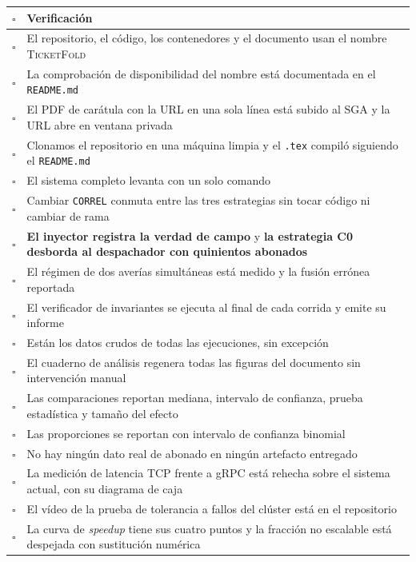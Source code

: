 \documentclass[11pt,a4paper]{article}
\begin{document}
	\begin{center}
		\small
		\begin{longtable}{@{}p{0.7cm}p{14.2cm}@{}}
			\toprule
			\textbf{$\square$} & \textbf{Verificación} \\
			\midrule
			\endhead
			$\square$ & El repositorio, el código, los contenedores y el documento usan el nombre \textsc{TicketFold} \\
			$\square$ & La comprobación de disponibilidad del nombre está documentada en el \texttt{README.md} \\
			$\square$ & El PDF de carátula con la URL en una sola línea está subido al SGA y la URL abre en ventana privada \\
			$\square$ & Clonamos el repositorio en una máquina limpia y el \texttt{.tex} compiló siguiendo el \texttt{README.md} \\
			$\square$ & El sistema completo levanta con un solo comando \\
			$\square$ & Cambiar \texttt{CORREL} conmuta entre las tres estrategias sin tocar código ni cambiar de rama \\
			$\square$ & \textbf{El inyector registra la verdad de campo} y \textbf{la estrategia C0 desborda al despachador con quinientos abonados} \\
			$\square$ & El régimen de dos averías simultáneas está medido y la fusión errónea reportada \\
			$\square$ & El verificador de invariantes se ejecuta al final de cada corrida y emite su informe \\
			$\square$ & Están los datos crudos de todas las ejecuciones, sin excepción \\
			$\square$ & El cuaderno de análisis regenera todas las figuras del documento sin intervención manual \\
			$\square$ & Las comparaciones reportan mediana, intervalo de confianza, prueba estadística y tamaño del efecto \\
			$\square$ & Las proporciones se reportan con intervalo de confianza binomial \\
			$\square$ & No hay ningún dato real de abonado en ningún artefacto entregado \\
			$\square$ & La medición de latencia TCP frente a gRPC está rehecha sobre el sistema actual, con su diagrama de caja \\
			$\square$ & El vídeo de la prueba de tolerancia a fallos del clúster está en el repositorio \\
			$\square$ & La curva de \emph{speedup} tiene sus cuatro puntos y la fracción no escalable está despejada con sustitución numérica \\

\end{longtable}
\end{center}
\end{document}

